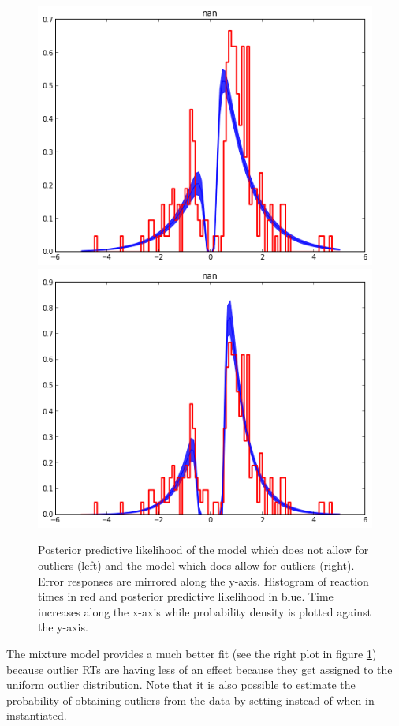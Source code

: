 \documentclass[letterpaper,10pt,english]{article}
\begin{document}
\begin{figure}
\includegraphics[width=0.5\columnwidth]{hddm_demo_fig_10.png}
\includegraphics[width=0.5\columnwidth]{hddm_demo_fig_11.png}
\caption{Posterior predictive likelihood of the model which does not allow for outliers (left) and the model which does allow for outliers (right). Error responses are mirrored along the y-axis. Histogram of reaction times in red and posterior predictive likelihood in blue. Time increases along the x-axis while probability density is plotted against the y-axis. }
\label{fig.outliers}
\end{figure}


The mixture model provides a much better fit (see the right plot in figure \ref{fig.outliers}) because outlier RTs are having less of an effect because they get assigned to the uniform outlier distribution. Note that it is also possible to estimate the probability of obtaining outliers from the data by setting  instead of  when  in instantiated.
\end{document}
